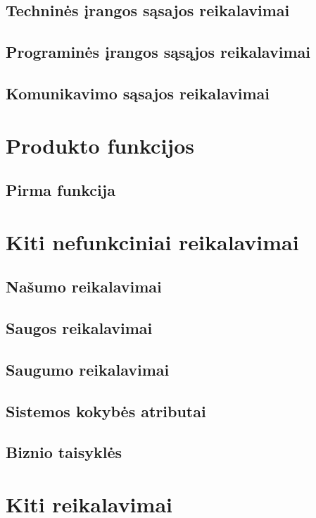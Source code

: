 \documentclass[oneside]{VUMIFPSkursinis}
\begin{document}
\subsection{Techninės įrangos sąsajos reikalavimai}
\subsection{Programinės įrangos sąsąjos reikalavimai}
\subsection{Komunikavimo sąsajos reikalavimai}

\section{Produkto funkcijos}
\subsection{Pirma funkcija}

\section{Kiti nefunkciniai reikalavimai}
\subsection{Našumo reikalavimai}
\subsection{Saugos reikalavimai}
\subsection{Saugumo reikalavimai}
\subsection{Sistemos kokybės atributai}
\subsection{Biznio taisyklės}

\section{Kiti reikalavimai}
\end{document}
